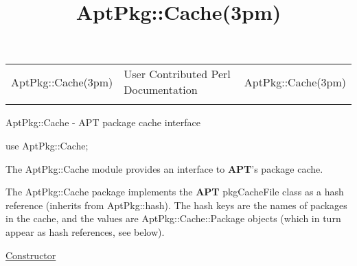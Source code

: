 \documentclass[]{article}
\title{AptPkg::Cache(3pm)}
\author{}
\date{}
\let\realtextbf=\textbf
\renewcommand{\textbf}[1]{\textcolor{boldcolor}{\realtextbf{#1}}}
\renewcommand{\emph}[1]{\underline{#1}}
\begin{document}
\maketitle

\begin{longtable}[c]{@{}lll@{}}
\toprule\addlinespace
AptPkg::Cache(3pm) & User Contributed Perl Documentation &
AptPkg::Cache(3pm)
\\\addlinespace
\bottomrule
\end{longtable}


AptPkg::Cache - APT package cache interface


use AptPkg::Cache;


The AptPkg::Cache module provides an interface to \textbf{APT}'s package
cache.


The AptPkg::Cache package implements the \textbf{APT} pkgCacheFile class
as a hash reference (inherits from AptPkg::hash). The hash keys are the
names of packages in the cache, and the values are
AptPkg::Cache::Package objects (which in turn appear as hash references,
see below).

\emph{Constructor}
\end{document}
